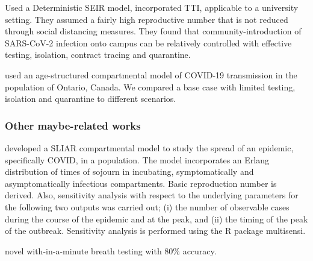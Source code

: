 \documentclass[12pt]{article}
\newcommand{\covid}{COVID-19\xspace}
\theoremstyle{definition} %
\begin{document}
\citep{lopman2020model} Used a Deterministic SEIR model, incorporated TTI, applicable to a university setting. They assumed a fairly high reproductive number that is not reduced through social
distancing measures. They found that community-introduction of SARS-CoV-2 infection onto campus can be
relatively controlled with effective testing, isolation, contract tracing and quarantine.

\citep{tuite2020mathematical} used an age-structured compartmental model of \covid transmission in the population of Ontario, Canada. We compared a base case with limited testing, isolation and quarantine to different scenarios. 
\subsubsection{Other maybe-related works}
\citep{arino2020simple} developed a SLIAR compartmental model to study the spread of an epidemic, specifically COVID, in a population. The model incorporates an Erlang distribution of times of sojourn in incubating, symptomatically and asymptomatically infectious compartments. Basic reproduction number is derived. Also, sensitivity analysis with respect to the underlying parameters for the following two outputs was carried out; (i) the number of observable cases during the course of the epidemic and at the peak, and (ii) the timing of the peak of the outbreak. Sensitivity analysis is performed using the R package multisensi.

\citep{ruszkiewicz2020diagnosis} novel with-in-a-minute breath testing with 80\% accuracy. 
\end{document}
